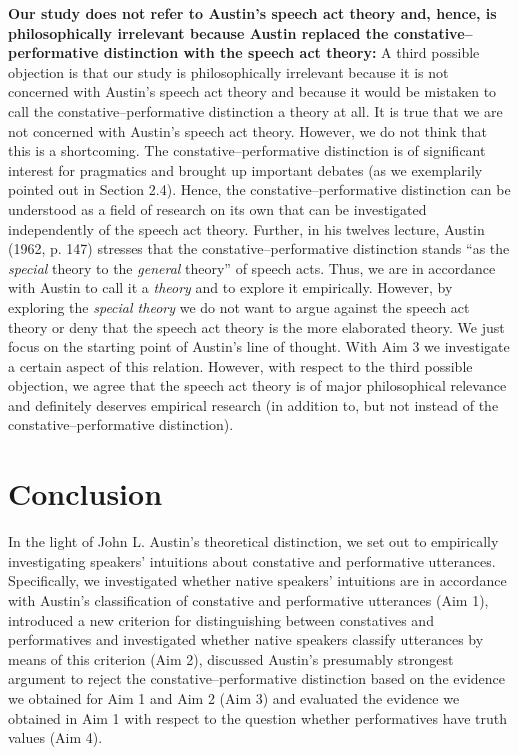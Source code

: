 \documentclass[egregdoesnotlikesansseriftitles,12pt]{scrartcl}
\begin{document}
\noindent\textbf{Our study does not refer to Austin's speech act theory and, hence, is philosophically irrelevant because Austin replaced the constative--performative distinction with the speech act theory:} A third possible objection is that our study is philosophically irrelevant because it is not concerned with Austin's speech act theory and because it would be mistaken to call the constative--performative distinction a theory at all. It is true that we are not concerned with Austin's speech act theory. However, we do not think that this is a shortcoming. The constative--performative distinction is of significant interest for pragmatics and brought up important debates (as we exemplarily pointed out in Section 2.4). Hence, the constative--performative distinction can be understood as a field of research on its own that can be investigated independently of the speech act theory. Further, in his twelves lecture, Austin (1962, p. 147) stresses that the constative--performative distinction stands ``as the \textit{special} theory to the \textit{general} theory'' of speech acts. Thus, we are in accordance with Austin to call it a \textit{theory} and to explore it empirically. However, by exploring the \textit{special theory} we do not want to argue against the speech act theory or deny that the speech act theory is the more elaborated theory. We just focus on the starting point of Austin's line of thought. With Aim 3 we investigate a certain aspect of this relation. However, with respect to the third possible objection, we agree that the speech act theory is of major philosophical relevance and definitely deserves empirical research (in addition to, but not instead of the constative--performative distinction).\\ 


\section{Conclusion}\label{sec:conclusion}
In the light of John L. Austin's theoretical distinction, we set out to empirically investigating speakers' intuitions about constative and performative utterances. Specifically, we investigated whether native speakers' intuitions are in accordance with Austin's classification of constative and performative utterances (Aim 1), introduced a new criterion for distinguishing between constatives and performatives and investigated whether native speakers classify utterances by means of this criterion (Aim 2), discussed Austin's presumably strongest argument to reject the constative--performative distinction based on the evidence we obtained for Aim 1 and Aim 2 (Aim 3) and evaluated the evidence we obtained in Aim 1 with respect to the question whether performatives have truth values (Aim 4).
\end{document}
